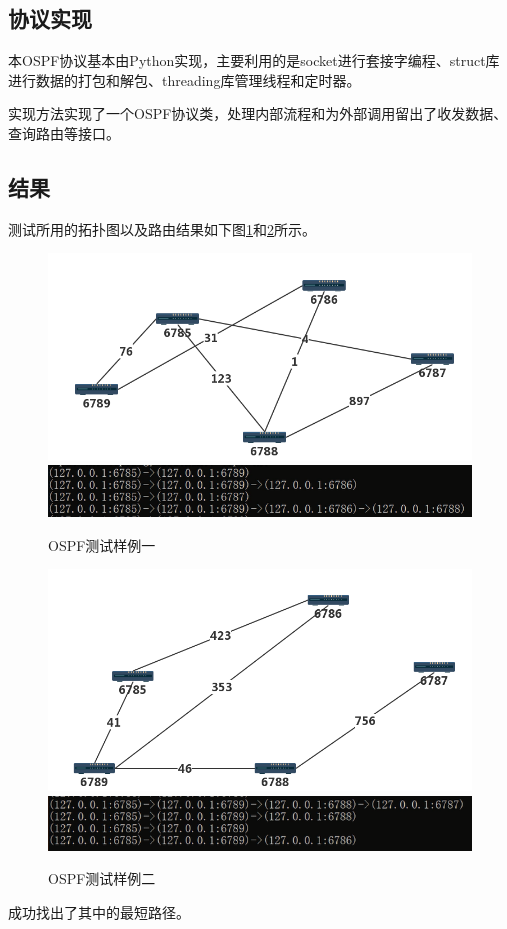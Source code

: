 	\subsection{协议实现} %
	\label{sub:协议实现}
		本OSPF协议基本由Python实现，主要利用的是socket进行套接字编程、struct库进行数据的打包和解包、threading库管理线程和定时器。
		\par 实现方法实现了一个OSPF协议类，处理内部流程和为外部调用留出了收发数据、查询路由等接口。
	\subsection{结果} %
	\label{sub:结果}
		测试所用的拓扑图以及路由结果如下图\ref{fig:ospfTest1}和\ref{fig:ospfTest2}所示。
		\begin{figure}[H]
			\centering
			\includegraphics[scale=0.4]{imgs/topo2/tpop1.png}
			\includegraphics[scale=1]{imgs/ospfTest1.PNG}
			\caption{OSPF测试样例一}
			\label{fig:ospfTest1}
		\end{figure}
		\begin{figure}[H]
			\centering
			\includegraphics[scale=0.4]{imgs/topo2/topo2.png}
			\includegraphics[scale=1]{imgs/ospfTest2.PNG}
			\caption{OSPF测试样例二}
			\label{fig:ospfTest2}
		\end{figure}
		成功找出了其中的最短路径。
